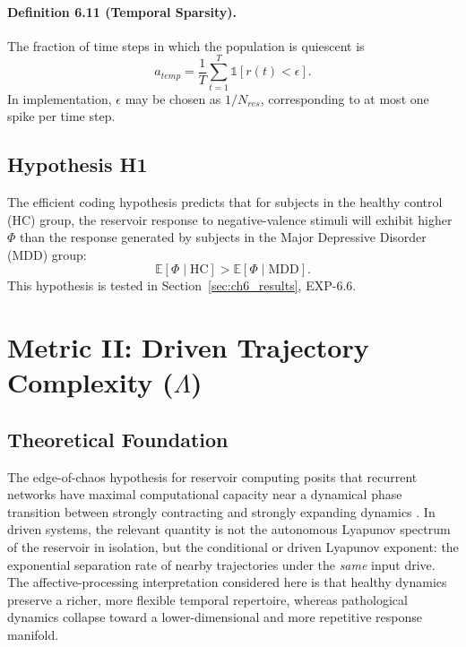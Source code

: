 \paragraph{Definition 6.11 (Temporal Sparsity).}
The fraction of time steps in which the population is quiescent is
\begin{equation}
a_{temp}=\frac{1}{T}\sum_{t=1}^{T} \mathbb{1}[r(t)<\epsilon].
\end{equation}
In implementation, $\epsilon$ may be chosen as $1/N_{res}$, corresponding to at most one spike per time step.

\subsection{Hypothesis H1}
The efficient coding hypothesis predicts that for subjects in the healthy control (HC) group, the reservoir response to negative-valence stimuli will exhibit higher $\Phi$ than the response generated by subjects in the Major Depressive Disorder (MDD) group:
\begin{equation}
\mathbb{E}[\Phi\mid \mathrm{HC}] > \mathbb{E}[\Phi\mid \mathrm{MDD}].
\end{equation}
This hypothesis is tested in Section~\ref{sec:ch6_results}, EXP-6.6.

\section{Metric II: Driven Trajectory Complexity ($\Lambda$)}
\label{sec:dynamics_lambda}

\subsection{Theoretical Foundation}

The edge-of-chaos hypothesis for reservoir computing posits that recurrent networks have maximal computational capacity near a dynamical phase transition between strongly contracting and strongly expanding dynamics \cite{langton_computation_1990,bertschinger_real-time_2004}. In driven systems, the relevant quantity is not the autonomous Lyapunov spectrum of the reservoir in isolation, but the conditional or driven Lyapunov exponent: the exponential separation rate of nearby trajectories under the \emph{same} input drive. The affective-processing interpretation considered here is that healthy dynamics preserve a richer, more flexible temporal repertoire, whereas pathological dynamics collapse toward a lower-dimensional and more repetitive response manifold.

